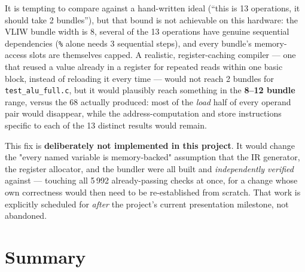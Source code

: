 \documentclass[11pt,a4paper]{article}
\begin{document}
It is tempting to compare against a hand-written ideal (``this is 13 operations, it should
take 2 bundles''), but that bound is not achievable on this hardware: the VLIW bundle
width is 8, several of the 13 operations have genuine sequential dependencies (\texttt{\%}
alone needs 3 sequential steps), and every bundle's memory-access slots are themselves
capped. A realistic, register-caching compiler --- one that reused a value already in a
register for repeated reads within one basic block, instead of reloading it every time ---
would not reach 2 bundles for \texttt{test\_alu\_full.c}, but it would plausibly reach
something in the \textbf{8--12 bundle} range, versus the 68 actually produced: most of the
\emph{load} half of every operand pair would disappear, while the address-computation and
store instructions specific to each of the 13 distinct results would remain.

This fix is \textbf{deliberately not implemented in this project}. It would change the
"every named variable is memory-backed" assumption that the IR generator, the register
allocator, and the bundler were all built and \emph{independently verified} against ---
touching all 5\,992 already-passing checks at once, for a change whose own correctness
would then need to be re-established from scratch. That work is explicitly scheduled for
\emph{after} the project's current presentation milestone, not abandoned.

\section{Summary}
\end{document}
